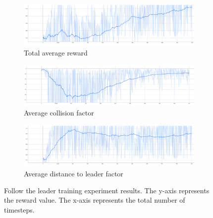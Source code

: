 \documentclass[12pt,a4paper,openright,twoside]{book}
\begin{document}
\begin{figure}[t]
    \centering
    \begin{subfigure}[b]{0.9\textwidth}
        \centering
        \includegraphics[width=\textwidth]{figures/ftl-reward.png}
        \caption{Total average reward}
    \end{subfigure}
    \hfill
    \begin{subfigure}[b]{0.9\textwidth}
        \centering
        \includegraphics[width=\textwidth]{figures/ftl-collision.png}
        \caption{Average collision factor}
    \end{subfigure}
    \hfill
    \begin{subfigure}[b]{0.9\textwidth}
        \centering
        \includegraphics[width=\textwidth]{figures/ftl-distance-leader.png}
        \caption{Average distance to leader factor}
    \end{subfigure}
\caption{Follow the leader training experiment results. The y-axis represents the reward value.
The x-axis represents the total number of timesteps.}
\label{fig:ftl-results}
\end{figure}
\end{document}
